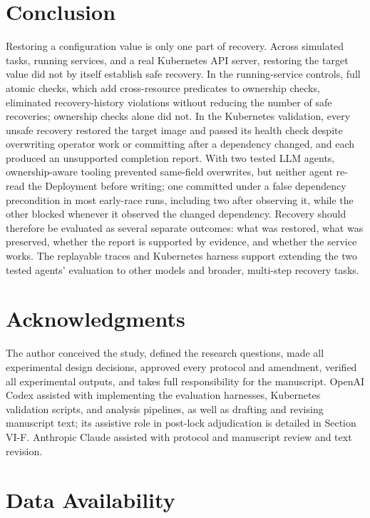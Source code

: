 \documentclass[conference,10pt]{IEEEtran}
\begin{document}
\section{Conclusion}

Restoring a configuration value is only one part of recovery. Across simulated tasks, running services, and a real Kubernetes API server, restoring the target value did not by itself establish safe recovery. In the running\hyp{}service controls, full atomic checks, which add cross\hyp{}resource predicates to ownership checks, eliminated recovery\hyp{}history violations without reducing the number of safe recoveries; ownership checks alone did not. In the Kubernetes validation, every unsafe recovery restored the target image and passed its health check despite overwriting operator work or committing after a dependency changed, and each produced an unsupported completion report. With two tested LLM agents, ownership\hyp{}aware tooling prevented same\hyp{}field overwrites, but neither agent re\hyp{}read the Deployment before writing; one committed under a false dependency precondition in most early\hyp{}race runs, including two after observing it, while the other blocked whenever it observed the changed dependency. Recovery should therefore be evaluated as several separate outcomes: what was restored, what was preserved, whether the report is supported by evidence, and whether the service works. The replayable traces and Kubernetes harness support extending the two tested agents' evaluation to other models and broader, multi\hyp{}step recovery tasks.

\section*{Acknowledgments}

The author conceived the study, defined the research questions, made all experimental design decisions, approved every protocol and amendment, verified all experimental outputs, and takes full responsibility for the manuscript. OpenAI Codex assisted with implementing the evaluation harnesses, Kubernetes validation scripts, and analysis pipelines, as well as drafting and revising manuscript text; its assistive role in post\hyp{}lock adjudication is detailed in Section VI\hyp{}F. Anthropic Claude assisted with protocol and manuscript review and text revision.

\section*{Data Availability}
\end{document}
